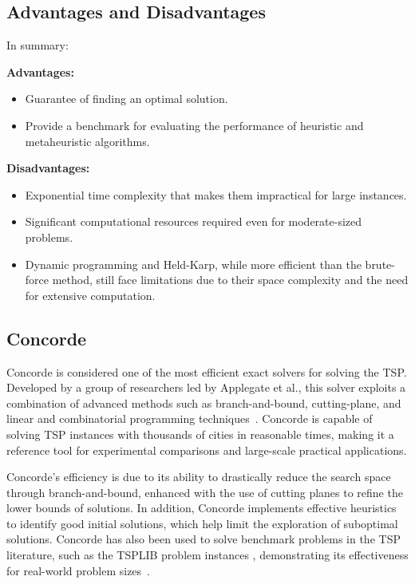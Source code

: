 \subsection{Advantages and Disadvantages}

In summary:

\textbf{Advantages:}
\begin{itemize}
	\item Guarantee of finding an optimal solution.
	\item Provide a benchmark for evaluating the performance of heuristic and metaheuristic algorithms.
\end{itemize}

\textbf{Disadvantages:}
\begin{itemize}
	\item Exponential time complexity that makes them impractical for large instances.
	\item Significant computational resources required even for moderate-sized problems.
	\item Dynamic programming and Held-Karp, while more efficient than the brute-force method, still face limitations due to their space complexity and the need for extensive computation.
\end{itemize}


\subsection{Concorde}


Concorde is considered one of the most efficient exact solvers for solving the \Gls{TSP}. Developed by a group of researchers led by Applegate et al., this solver exploits a combination of advanced methods such as branch-and-bound, cutting-plane, and linear and combinatorial programming techniques~\cite{Applegate2007}. Concorde is capable of solving \Gls{TSP} instances with thousands of cities in reasonable times, making it a reference tool for experimental comparisons and large-scale practical applications.

Concorde's efficiency is due to its ability to drastically reduce the search space through branch-and-bound, enhanced with the use of cutting planes to refine the lower bounds of solutions. In addition, Concorde implements effective heuristics to identify good initial solutions, which help limit the exploration of suboptimal solutions. Concorde has also been used to solve benchmark problems in the \Gls{TSP} literature, such as the TSPLIB problem instances \cite{TSPLIB}, demonstrating its effectiveness for real-world problem sizes~\cite{Cook2011}.

